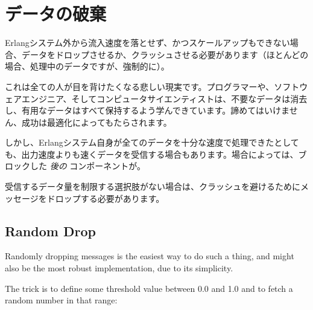 \section{データの破棄}

Erlangシステム外から流入速度を落とせず、かつスケールアップもできない場合、データをドロップさせるか、クラッシュさせる必要があります（ほとんどの場合、処理中のデータですが、強制的に）。

これは全ての人が目を背けたくなる悲しい現実です。プログラマーや、ソフトウェアエンジニア、そしてコンピュータサイエンティストは、不要なデータは消去し、有用なデータはすべて保持するよう学んできています。諦めてはいけません、成功は最適化によってもたらされます。

しかし、Erlangシステム自身が全てのデータを十分な速度で処理できたとしても、出力速度よりも速くデータを受信する場合もあります。場合によっては、ブロックした \emph{後の} コンポーネントが。

受信するデータ量を制限する選択肢がない場合は、クラッシュを避けるためにメッセージをドロップする必要があります。

\subsection{Random Drop}

Randomly dropping messages is the easiest way to do such a thing, and might also be the most robust implementation, due to its simplicity.

The trick is to define some threshold value between 0.0 and 1.0 and to fetch a random number in that range:

